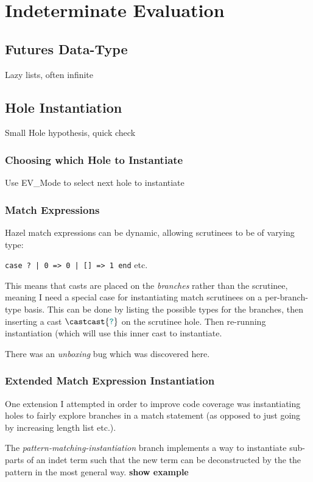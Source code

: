 \section{Indeterminate Evaluation}\label{sec:IndetEval}
\subsection{Futures Data-Type}\label{sec:Futures}
Lazy lists, often infinite
\subsection{Hole Instantiation}\label{sec:HoleInstantiation}
Small Hole hypothesis, quick check


\subsubsection{Choosing which Hole to Instantiate}
Use EV\_Mode to select next hole to instantiate

\subsubsection{Match Expressions}
Hazel match expressions can be dynamic, allowing scrutinees to be of varying type:

\texttt{case ? | 0 => 0 | [] => 1 end} etc.

This means that casts are placed on the \textit{branches} rather than the scrutinee, meaning I need a special case for instantiating match scrutinees on a per-branch-type basis. This can be done by listing the possible types for the branches, then inserting a cast $\castcast{\dyn}$ on the scrutinee hole. Then re-running instantiation (which will use this inner cast to instantiate.

There was an \textit{unboxing} bug which was discovered here.

\subsubsection{Extended Match Expression Instantiation}
One extension I attempted in order to improve code coverage was instantiating holes to fairly explore branches in a match statement (as opposed to just going by increasing length list etc.). 

The \textit{pattern-matching-instantiation} branch implements a way to instantiate sub-parts of an indet term such that the new term can be deconstructed by the the pattern in the most general way. \textbf{show example}

